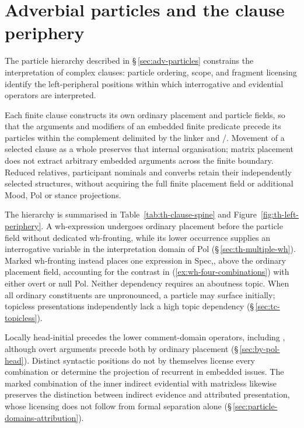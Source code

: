 \section{Adverbial particles and the clause periphery}
\label{sec:th-particle-integration}

The particle hierarchy described in §\,\ref{sec:adv-particles} constrains
the interpretation of complex clauses: particle ordering, scope, and fragment
licensing identify the left-peripheral positions within which interrogative and
evidential operators are interpreted.

Each finite clause constructs its own ordinary placement and particle fields,
so that the arguments and modifiers of an embedded finite predicate precede
its particles within the complement delimited by the linker and
/. Movement of a selected clause as a whole preserves that
internal organisation; matrix placement does not extract arbitrary embedded
arguments across the finite boundary. Reduced relatives, participant nominals
and converbs retain their independently selected structures, without acquiring
the full finite placement field or additional Mood, Pol or stance projections.

The hierarchy is summarised in Table~\ref{tab:th-clause-spine} and
Figure~\ref{fig:th-left-periphery}. A wh-expression undergoes ordinary
placement before the particle field without dedicated wh-fronting, while its
lower occurrence supplies an interrogative variable in the interpretation
domain of Pol (§\,\ref{sec:th-multiple-wh}). Marked wh-fronting instead
places one expression in Spec,, above the ordinary placement
field, accounting for the contrast in (\ref{ex:wh-four-combinations}) with
either overt or null Pol. Neither dependency requires an aboutness topic.
When all ordinary constituents are unpronounced, a particle may surface
initially; topicless presentations independently lack a high topic dependency
(§\,\ref{sec:tc-topicless}).

Locally head-initial  precedes the lower comment-domain operators,
including , although overt arguments precede both by ordinary
placement (§\,\ref{sec:by-pol-head}). Distinct syntactic positions do not
by themselves license every combination or determine the projection of
recurrent  in embedded issues. The marked combination of the
inner indirect evidential with matrixless  likewise preserves the
distinction between indirect evidence and attributed presentation, whose
licensing does not follow from formal separation alone
(§\,\ref{sec:particle-domains-attribution}).


